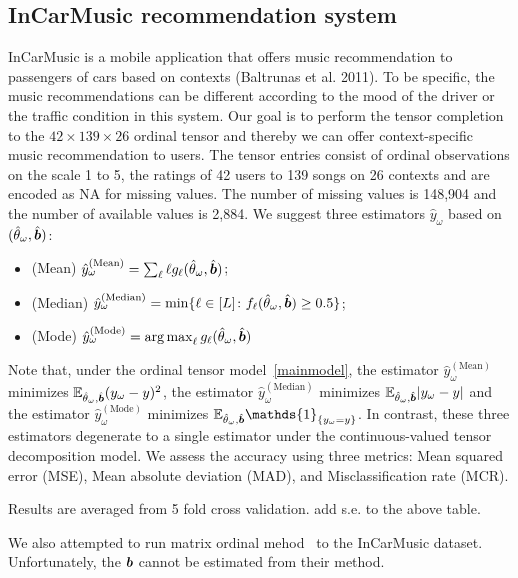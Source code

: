 \documentclass{article}
\theoremstyle{plain}
\theoremstyle{definition}
\begin{document}
\subsection{InCarMusic recommendation system}
InCarMusic is a mobile application that offers music recommendation to passengers of cars based on contexts (Baltrunas et al. 2011). To be specific, the music recommendations can be different according to the mood of the driver or the traffic condition in this system. Our goal is to perform the tensor completion to the $42\times 139\times 26$ ordinal tensor and thereby we can offer context-specific music recommendation to users. The tensor entries consist of ordinal observations on the scale 1 to 5, the ratings of 42 users to 139 songs on 26 contexts and are encoded as NA for missing values. The number of missing values is 148,904 and the number of available values is 2,884.
We suggest three estimators $\hat y_\omega$ based on $(\hat \theta_\omega,\hat {\bm{b}})$:
\begin{itemize}
\item (Mean) $\hat y^{(\text{Mean})}_\omega=\sum_\ell \ell g_\ell(\hat \theta_\omega,\hat {\bm{b}}) $;
\item (Median) $\hat y^{(\text{Median})}_\omega=\min\{\ell\in[L]\colon f_\ell(\hat \theta_\omega,\hat {\bm{b}})\geq 0.5\}$;
\item (Mode) $\hat y^{(\text{Mode})}_\omega=\operatorname*{arg\,max}_\ell g_\ell(\hat \theta_\omega,\hat {\bm{b}}) $
\end{itemize}
Note that, under the ordinal tensor model~\eqref{mainmodel}, the estimator $\hat y^{(\text{Mean})}_\omega$ minimizes $\mathbb{E}_{\hat{\theta}_\omega,\hat{\bm{b}}}(y_\omega-y)^2$, the estimator $\hat y^{(\text{Median})}_\omega$ minimizes $\mathbb{E}_{\hat{\theta}_\omega,\hat{\bm{b}}}|y_\omega-y|$
and the estimator $\hat y^{(\text{Mode})}_\omega $ minimizes $\mathbb{E}_{\hat{\theta}_\omega,\hat{\mb}}\mathds{1}_{\{y_\omega=y\}}$.
In contrast, these three estimators degenerate to a single estimator under the continuous-valued tensor decomposition model. We assess the accuracy using three metrics: Mean squared error (MSE), Mean absolute deviation (MAD), and Misclassification rate (MCR).

Results are averaged from 5 fold cross validation. {\color{red} add s.e. to the above table.}

\begin{table}[H]
\caption{Comparison of tensor completion performance on InCarMusic dataset.}
\end{table}

We also attempted to run matrix ordinal mehod~\citep{bhaskar2016probabilistic} to the InCarMusic dataset. Unfortunately, the $\bm{b}$ cannot be estimated from their method.



\end{document}
